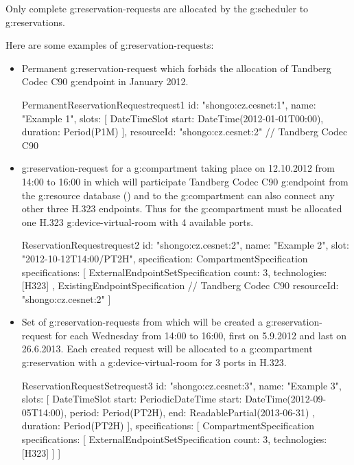 Only complete \glspl{g:reservation-request} are allocated by the \gls{g:scheduler} to \glspl{g:reservation}.

Here are some examples of \glspl{g:reservation-request}:

\begin{itemize}

\item Permanent \gls{g:reservation-request} which forbids the allocation of Tandberg Codec C90 \gls{g:endpoint} in January 2012.

\label{oc:request1}
\begin{ObjectCode}{PermanentReservationRequest}{request1}{}
id: "shongo:cz.cesnet:1",
name: "Example 1",
slots: [
  DateTimeSlot {
    start: DateTime(2012-01-01T00:00),
    duration: Period(P1M)
  }
],
resourceId: "shongo:cz.cesnet:2" // Tandberg Codec C90
\end{ObjectCode}

\item \Gls{g:reservation-request} for a \gls{g:compartment} taking place on 12.10.2012 from 14:00 to 16:00 in which will participate Tandberg Codec C90 \gls{g:endpoint} from the \gls{g:resource} database () and to the \gls{g:compartment} can also connect any other three H.323 endpoints. Thus for the \gls{g:compartment} must be allocated one H.323 \gls{g:device-virtual-room} with 4 available ports.

\label{oc:request2}
\begin{ObjectCode}{ReservationRequest}{request2}{}
id: "shongo:cz.cesnet:2",
name: "Example 2",
slot: "2012-10-12T14:00/PT2H",
specification: CompartmentSpecification {
  specifications: [
    ExternalEndpointSetSpecification {
      count: 3,
      technologies: [H323]
    },
    ExistingEndpointSpecification { // Tandberg Codec C90
      resourceId: "shongo:cz.cesnet:2"
    }
  ]
}
\end{ObjectCode}

\item Set of \glspl{g:reservation-request} from which will be created a \gls{g:reservation-request} for each Wednesday from 14:00 to 16:00, first on 5.9.2012 and last on 26.6.2013. Each created request will be allocated to a \gls{g:compartment} \gls{g:reservation} with a \gls{g:device-virtual-room} for 3 ports in H.323.

\label{oc:request3}
\begin{ObjectCode}{ReservationRequestSet}{request3}{}
id: "shongo:cz.cesnet:3",
name: "Example 3",
slots: [
  DateTimeSlot {
    start: PeriodicDateTime{
      start: DateTime(2012-09-05T14:00),
      period: Period(PT2H),
      end: ReadablePartial(2013-06-31)
    },
    duration: Period(PT2H)
  }
],
specifications: [
  CompartmentSpecification {
    specifications: [
      ExternalEndpointSetSpecification {
        count: 3,
        technologies: [H323]
      }
    ]
  }
]
\end{ObjectCode}


\end{itemize}
